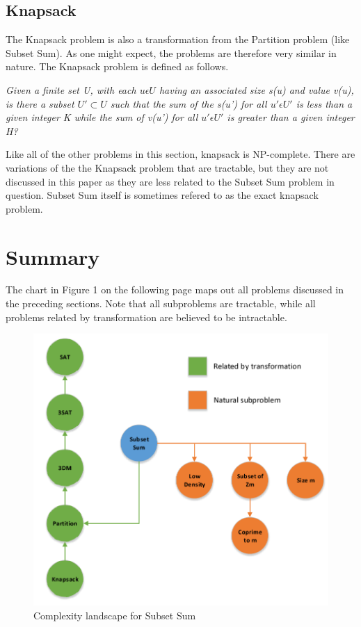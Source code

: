\documentclass{report}
\begin{document}
\subsection{Knapsack}

The Knapsack problem is also a transformation from the Partition problem (like Subset Sum). As one might expect, the problems are
therefore very similar in nature. The Knapsack problem is defined as follows.

\textit{Given a finite set U, with each $u \epsilon U$ having an associated size s(u) and value v(u), is there a subset $U' \subset U$ such that the sum of the s(u') for all $u' \epsilon U'$ is less than a given integer K while the sum of v(u') for all  $u' \epsilon U'$ is greater than a given integer H?}

Like all of the other problems in this section, knapsack is NP-complete. There are variations of the the Knapsack problem that are
tractable, but they are not discussed in this paper as they are less related to the Subset Sum problem in question. Subset Sum itself
is sometimes refered to as the exact knapsack problem.

\section{Summary}

The chart in Figure 1 on the following page maps out all problems discussed in the preceding sections. Note that all subproblems are tractable, while all problems related by
transformation are believed to be intractable.

\begin{figure}[h]
\centering
\includegraphics[width=12cm]{comp_chart.png}
\caption{Complexity landscape for Subset Sum}
\end{figure}
\end{document}
